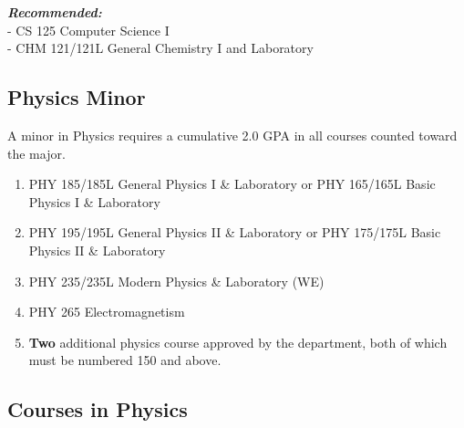 \documentclass[
  letterpaper,
]{scrbook}
\begin{document}
\textbf{\emph{Recommended:}}\\
- CS 125 Computer Science I\\
- CHM 121/121L General Chemistry I and Laboratory

\subsection{Physics Minor}\label{physics-minor}

A minor in Physics requires a cumulative 2.0 GPA in all courses counted
toward the major.

\begin{enumerate}
\def\labelenumi{\arabic{enumi}.}
\item
  PHY 185/185L General Physics I \& Laboratory or PHY 165/165L Basic
  Physics I \& Laboratory
\item
  PHY 195/195L General Physics II \& Laboratory or PHY 175/175L Basic
  Physics II \& Laboratory
\item
  PHY 235/235L Modern Physics \& Laboratory (WE)
\item
  PHY 265 Electromagnetism
\item
  \textbf{Two} additional physics course approved by the department,
  both of which must be numbered 150 and above.
\end{enumerate}

\subsection{Courses in Physics}\label{courses-in-physics}
\end{document}
